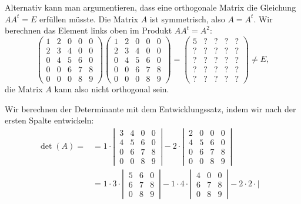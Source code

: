 \begin{loesung}
\begin{teilaufgaben}
Alternativ kann man argumentieren, dass eine orthogonale
Matrix die Gleichung $AA^t=E$ erfüllen müsste. Die Matrix $A$
ist symmetrisch, also $A=A^t$. Wir berechnen das Element links
oben im Produkt $AA^t=A^2$:
\[
\begin{pmatrix}
1&2&0&0&0\\
2&3&4&0&0\\
0&4&5&6&0\\
0&0&6&7&8\\
0&0&0&8&9
\end{pmatrix}
\begin{pmatrix}
1&2&0&0&0\\
2&3&4&0&0\\
0&4&5&6&0\\
0&0&6&7&8\\
0&0&0&8&9
\end{pmatrix}
=
\begin{pmatrix}
5&?&?&?&?\\
?&?&?&?&?\\
?&?&?&?&?\\
?&?&?&?&?\\
?&?&?&?&?
\end{pmatrix}
\ne E,
\]
die Matrix $A$ kann also nicht orthogonal sein.
\item
Wir berechnen der Determinante mit dem Entwicklungssatz, indem wir nach der
ersten Spalte entwickeln:
\begin{align*}
\det(A)=
&
=
1\cdot
\left|\,\begin{matrix}
3&4&0&0\\
4&5&6&0\\
0&6&7&8\\
0&0&8&9
\end{matrix}\,\right|
-2\cdot
\left|\,\begin{matrix}
2&0&0&0\\
4&5&6&0\\
0&6&7&8\\
0&0&8&9
\end{matrix}\,\right|
\\
&
=
1\cdot 3\cdot
\left|\,\begin{matrix}
5&6&0\\
6&7&8\\
0&8&9
\end{matrix}\,\right|
-1\cdot 4\cdot
\left|\,\begin{matrix}
4&0&0\\
6&7&8\\
0&8&9
\end{matrix}\,\right|
-2\cdot2\cdot
\left|\,\begin{matrix}

\end{matrix}
\end{align*}
\end{teilaufgaben}
\end{loesung}
